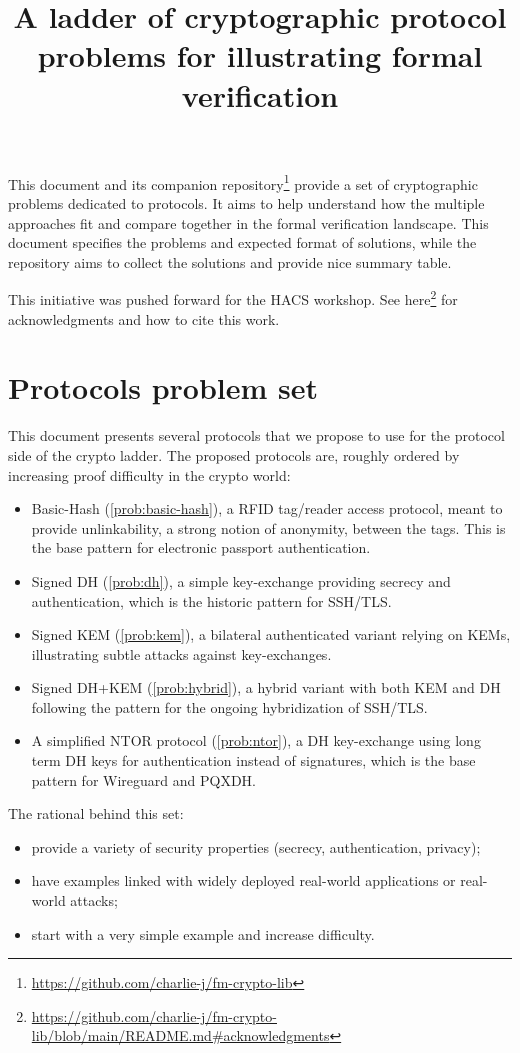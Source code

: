 \documentclass{article}
\title{A ladder of cryptographic protocol problems for illustrating formal verification}
\begin{document}
\maketitle

This document and its companion repository\footnote{\url{https://github.com/charlie-j/fm-crypto-lib}} provide a set of cryptographic problems dedicated to protocols. It aims to help understand how the multiple approaches fit and compare together in the formal verification landscape. This document specifies the problems and expected format of solutions, while the repository aims to collect the solutions and provide nice summary table.

This initiative was pushed forward for the HACS workshop. See here\footnote{\url{https://github.com/charlie-j/fm-crypto-lib/blob/main/README.md#acknowledgments}} for acknowledgments and how to cite this work.

\section{Protocols problem set}

This document presents several protocols that we propose to use for the protocol side of the crypto ladder. The proposed protocols are, roughly ordered by increasing proof difficulty in the crypto world:
\begin{itemize}
\item Basic-Hash (\cref{prob:basic-hash}), a RFID tag/reader access protocol, meant to provide unlinkability, a strong notion of anonymity, between the tags. This is the base pattern for electronic passport authentication.
\item Signed DH (\cref{prob:dh}), a simple key-exchange providing secrecy and authentication,  which is the historic pattern for SSH/TLS.
\item Signed KEM (\cref{prob:kem}), a bilateral authenticated variant relying on KEMs, illustrating subtle attacks against key-exchanges. 
\item  Signed DH+KEM (\cref{prob:hybrid}), a hybrid variant with both KEM and DH following the pattern for the ongoing hybridization of SSH/TLS.
\item A simplified NTOR protocol (\cref{prob:ntor}), a DH key-exchange using long term DH keys for authentication instead of signatures, which is the base pattern for Wireguard and PQXDH.
\end{itemize}

The rational behind this set:
\begin{itemize}
\item provide a variety of security properties (secrecy, authentication, privacy);
\item have examples linked with widely deployed real-world applications or real-world attacks;  
\item start with a very simple example and increase difficulty. 
\end{itemize}
\end{document}
